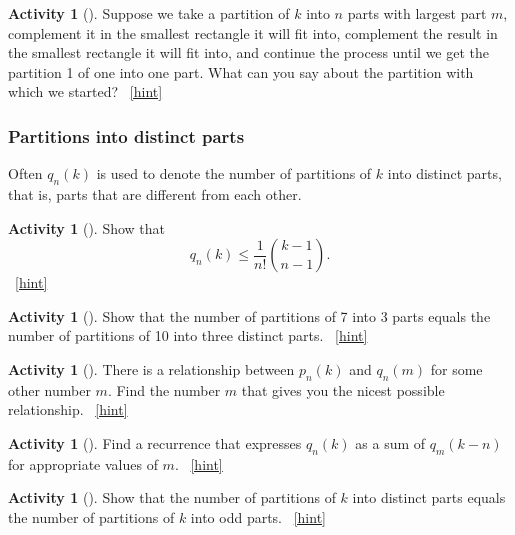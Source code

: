 \documentclass[10pt,]{book}
\theoremstyle{plain}
\theoremstyle{definition}
\theoremstyle{definition}
\theoremstyle{definition}
\newtheorem{activity}[project]{Activity}
\numberwithin{equation}{chapter}
\begin{document}
\begin{activity}[]\label{activity-247}
\hypertarget{p-1122}{}%
Suppose we take a partition of \(k\) into \(n\) parts with largest part \(m\), complement it in the smallest rectangle it will fit into, complement the result in the smallest rectangle it will fit into, and continue the process until we get the partition 1 of one into one part.  What can you say about the partition with which we started?%
~\hfill{\tiny\hyperlink{a-247}{[hint]}\hypertarget{q-247}{}}\end{activity}
\typeout{************************************************}
\typeout{************************************************}
\subsubsection[{Partitions into distinct parts}]{Partitions into distinct parts}\label{subsubsection-1}
\hypertarget{p-1129}{}%
Often \(q_n(k)\) is used to denote the number of partitions of \(k\) into distinct parts, that is, parts that are different from each other.%
\begin{activity}[]\label{activity-248}
\hypertarget{p-1130}{}%
Show that%
\begin{equation*}
q_n(k) \le \frac{1}{n!}\binom{k-1}{n-1}.
\end{equation*}
%
~\hfill{\tiny\hyperlink{a-248}{[hint]}\hypertarget{q-248}{}}\end{activity}
\begin{activity}[]\label{activity-249}
\hypertarget{p-1133}{}%
Show that the number of partitions of 7 into 3 parts equals the number of partitions of 10 into three distinct parts.%
~\hfill{\tiny\hyperlink{a-249}{[hint]}\hypertarget{q-249}{}}\end{activity}
\begin{activity}[]\label{activity-250}
\hypertarget{p-1136}{}%
There is a relationship between \(p_n(k)\) and \(q_n(m)\) for some other number \(m\). Find the number \(m\) that gives you the nicest possible relationship.%
~\hfill{\tiny\hyperlink{a-250}{[hint]}\hypertarget{q-250}{}}\end{activity}
\begin{activity}[]\label{activity-251}
\hypertarget{p-1139}{}%
Find a recurrence that expresses \(q_n(k)\) as a sum of \(q_m(k-n)\) for appropriate values of \(m\).%
~\hfill{\tiny\hyperlink{a-251}{[hint]}\hypertarget{q-251}{}}\end{activity}
\begin{activity}[]\label{activity-252}
\hypertarget{p-1142}{}%
Show that the number of partitions of \(k\) into distinct parts equals the number of partitions of \(k\) into odd parts.%
~\hfill{\tiny\hyperlink{a-252}{[hint]}\hypertarget{q-252}{}}\end{activity}
\end{document}

